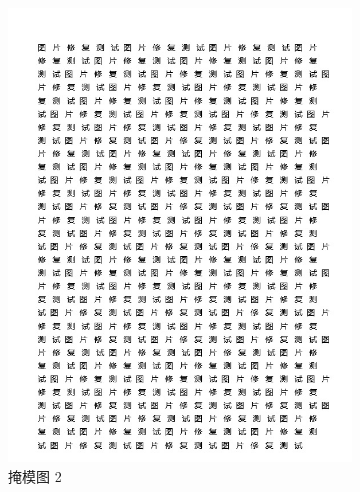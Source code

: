 \documentclass[UTF8]{ctexart}
\begin{document}
\begin{figure}[H]
\begin{subfigure}[b]{0.3\textwidth}
        \includegraphics[width=\textwidth]{mask2.jpg} %
        \caption{掩模图 2}
        \label{fig:mask2}
    \end{subfigure}
    \hfill
    \begin{subfigure}[b]{0.3\textwidth}

\end{subfigure}
\end{figure}
\end{document}
